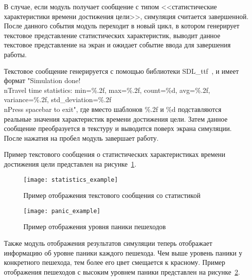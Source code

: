 В случае, если модуль получает сообщение с типом <<статистические характеристики времени достижения цели>>, симуляция считается завершенной.
После данного события модуль переходит в новый цикл, в котором генерирует текстовое представление статистических характеристик,
выводит данное текстовое представление на экран и ожидает событие ввода для завершения работы.

Текстовое сообщение генерируется с помощью библиотеки SDL\_ttf~\cite{libsdl_ttf_home}, и имеет формат
"Simulation done!\\nTravel time statistics: min=\%.2f, max=\%.2f, count=\%d, avg=\%.2f, variance=\%.2f, std\_deviation=\%.2f\\nPress spacebar to exit",
где вместо шаблонов \%.2f и \%d подставляются реальные значения характеристик времени достижения цели.
Затем данное сообщение преобразуется в текстуру и выводится поверх экрана симуляции.  После нажатия на пробел модуль завершает работу.

Пример текстового сообщения о статистических характеристиках времени достижения цели представлен на рисунке~\ref{sec:development:animator:statistics_example}.

\begin{figure}[!ht]
  \centering
  \texttt{[image: statistics\_example]}
  \caption{Пример отображения текстового сообщения со статистикой}
  \label{sec:development:animator:statistics_example}
\end{figure}

\begin{figure}[!ht]
  \centering
  \texttt{[image: panic\_example]}
  \caption{Пример отображения уровня паники пешеходов}
  \label{sec:development:animator:panic_example}
\end{figure}

Также модуль отображения результатов симуляции теперь отображает информацию об уровне паники каждого пешехода.
Чем выше уровень паники у конкретного пешехода, тем более его цвет смещается к красному.
Пример отображения пешеходов с высоким уровнем паники представлен на рисунке~\ref{sec:development:animator:panic_example}.


